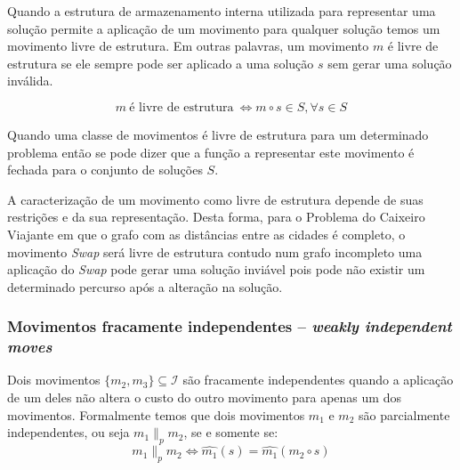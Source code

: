 Quando a estrutura de armazenamento interna utilizada para representar uma solução permite a aplicação de um movimento para qualquer solução temos um movimento livre de estrutura.
Em outras palavras, um movimento $m$ é livre de estrutura se ele sempre pode ser aplicado a uma solução $s$ sem gerar uma solução inválida.

\begin{equation} \label{eq:movimentoLivreDeContexto}
m \ \textrm{é livre de estrutura} \  \iff m \circ s \in S, \forall s \in S
\end{equation}

Quando uma classe de movimentos é livre de estrutura para um determinado problema então se pode dizer que a função a representar este movimento é fechada para o conjunto de soluções $S$.

A caracterização de um movimento como livre de estrutura depende de suas restrições e da sua representação.
Desta forma, para o Problema do Caixeiro Viajante em que o grafo com as distâncias entre as cidades é completo, o movimento \textit{Swap} será livre de estrutura contudo num grafo incompleto uma aplicação do \textit{Swap} pode gerar uma solução inviável pois pode não existir um determinado percurso após a alteração na solução.

\subsubsection{Movimentos fracamente independentes -- \emph{weakly independent moves}} \label{subsubsec:movimentosParcialmenteIndependentes}

Dois movimentos $\{m_2,m_3\} \subseteq \mathcal{I}$ são fracamente independentes quando a aplicação de um deles não altera o custo do outro movimento para apenas um dos movimentos.
Formalmente temos que dois movimentos $m_1$ e $m_2$ são parcialmente independentes, ou seja $m_1 \parallel_p m_2$, se e somente se:
\begin{equation}
m_1 \parallel_p m_2 \iff \widehat{m_1}(s) = \widehat{m_1}(m_2 \circ s)
\label{eq:movimentosParcialmenteIndependentes}
\end{equation}

